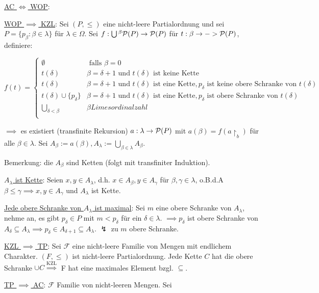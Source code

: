 \documentclass[12pt]{article}
\begin{document}
\begin{proofbox}
    \underline{AC $\iff$ WOP}: \checkmark

    \underline{WOP $\implies$ KZL}: Sei $(P, \leq)$ eine nicht-leere Partialordnung und sei $P = \{p_\beta : \beta \in \lambda\}$ für $\lambda \in \Omega$. Sei $f: \bigcup{}^\beta\mathcal{P}(P) \rightarrow \mathcal{P}(P)$ für $t: \beta \rightarrow -> \mathcal{P}(P)$, definiere:

    $$
    f(t) = \begin{cases}
        \emptyset & \text{ falls } \beta = 0 \\
        t(\delta) & \beta = \delta + 1 \text{ und } t(\delta) \text{ ist keine Kette} \\
        t(\delta) & \beta = \delta + 1 \text{ und } t(\delta) \text{ ist eine Kette}, p_\delta \text{ ist keine obere Schranke von } t(\delta) \\
        t(\delta) \cup \{p_\delta\} & \beta = \delta + 1 \text{ und } t(\delta) \text{ ist eine Kette}, p_\delta \text{ ist obere Schranke von } t(\delta) \\
        \bigcup\limits_{\delta < \beta} & \beta Limesordinalzahl \\
    \end{cases}
    $$

    $\implies $ es existiert (transfinite Rekursion) $a: \lambda \rightarrow \mathcal{P}(P)$ mit $a(\beta) = f(a\restriction_b)$ für alle $\beta \in \lambda$. Sei $A_\beta := a(\beta), A_\lambda := \bigcup\limits_{\beta \in \lambda} A_\beta$.

    Bemerkung: die $A_\beta$ sind Ketten (folgt mit transfiniter Induktion).

    \underline{$A_\lambda$ ist Kette}: Seien $x, y \in A_\lambda$, d.h. $x \in A_\beta, y \in A_\gamma$ für $\beta, \gamma \in \lambda$, o.B.d.A $\beta \leq \gamma \implies x, y \in A_\gamma$ und $A_\lambda$ ist Kette.

    \underline{Jede obere Schranke von $A_\lambda$ ist maximal}: Sei $m$ eine obere Schranke von $A_\lambda$, nehme an, es gibt $p_\delta \in P$ mit $m < p_\delta$ für ein $\delta \in \lambda$. $\implies p_\delta$ ist obere Schranke von $A_\delta \subseteq A_\lambda \implies p_\delta \in A_{\delta+1} \subseteq A_\lambda$. $\lightning$ zu $m$ obere Schranke.

    \underline{KZL $\implies$ TP}: Sei $\mathcal{F}$ eine nicht-leere Familie von Mengen mit endlichem Charakter. $(F, \leq)$ ist nicht-leere Partialordnung. Jede Kette $C$ hat die obere Schranke $\cup C \overset{\text{KZL}}{\implies} $ F hat eine maximales Element bzgl. $\subseteq$. 

    \underline{TP $\implies$ AC}: $\mathcal{F}$ Familie von nicht-leeren Mengen. Sei 

\end{proofbox}
\end{document}
